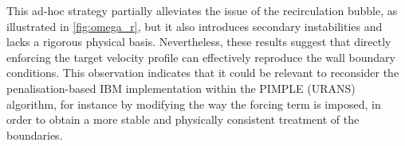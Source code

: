 This ad-hoc strategy partially alleviates the issue of the recirculation bubble, as illustrated in \autoref{fig:omega_r}, but it also introduces secondary instabilities and lacks a rigorous physical basis. Nevertheless, these results suggest that directly enforcing the target velocity profile can effectively reproduce the wall boundary conditions. This observation indicates that it could be relevant to reconsider the penalisation-based IBM implementation within the \ac{PIMPLE} (URANS) algorithm, for instance by modifying the way the forcing term is imposed, in order to obtain a more stable and physically consistent treatment of the boundaries.



